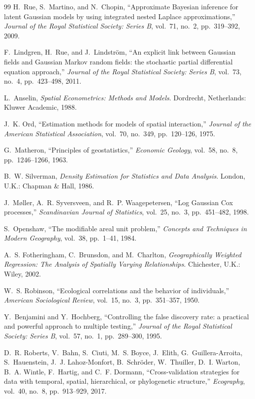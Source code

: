 \documentclass[conference]{IEEEtran}
\theoremstyle{definition}
\begin{document}
\begin{thebibliography}{99}
H.~Rue, S.~Martino, and N.~Chopin, ``Approximate Bayesian inference for latent Gaussian models by using integrated nested Laplace approximations,'' \emph{Journal of the Royal Statistical Society: Series B}, vol.~71, no.~2, pp.~319--392, 2009.

F.~Lindgren, H.~Rue, and J.~Lindstr\"{o}m, ``An explicit link between Gaussian fields and Gaussian Markov random fields: the stochastic partial differential equation approach,'' \emph{Journal of the Royal Statistical Society: Series B}, vol.~73, no.~4, pp.~423--498, 2011.

L.~Anselin, \emph{Spatial Econometrics: Methods and Models}. Dordrecht, Netherlands: Kluwer Academic, 1988.

J.~K. Ord, ``Estimation methods for models of spatial interaction,'' \emph{Journal of the American Statistical Association}, vol.~70, no.~349, pp.~120--126, 1975.

G.~Matheron, ``Principles of geostatistics,'' \emph{Economic Geology}, vol.~58, no.~8, pp.~1246--1266, 1963.

B.~W. Silverman, \emph{Density Estimation for Statistics and Data Analysis}. London, U.K.: Chapman \& Hall, 1986.

J.~M{\o}ller, A.~R. Syversveen, and R.~P. Waagepetersen, ``Log Gaussian Cox processes,'' \emph{Scandinavian Journal of Statistics}, vol.~25, no.~3, pp.~451--482, 1998.

S.~Openshaw, ``The modifiable areal unit problem,'' \emph{Concepts and Techniques in Modern Geography}, vol.~38, pp.~1--41, 1984.

A.~S. Fotheringham, C.~Brunsdon, and M.~Charlton, \emph{Geographically Weighted Regression: The Analysis of Spatially Varying Relationships}. Chichester, U.K.: Wiley, 2002.

W.~S. Robinson, ``Ecological correlations and the behavior of individuals,'' \emph{American Sociological Review}, vol.~15, no.~3, pp.~351--357, 1950.

Y.~Benjamini and Y.~Hochberg, ``Controlling the false discovery rate: a practical and powerful approach to multiple testing,'' \emph{Journal of the Royal Statistical Society: Series B}, vol.~57, no.~1, pp.~289--300, 1995.

D.~R. Roberts, V.~Bahn, S.~Ciuti, M.~S. Boyce, J.~Elith, G.~Guillera-Arroita, S.~Hauenstein, J.~J. Lahoz-Monfort, B.~Schr\"{o}der, W.~Thuiller, D.~I. Warton, B.~A. Wintle, F.~Hartig, and C.~F. Dormann, ``Cross-validation strategies for data with temporal, spatial, hierarchical, or phylogenetic structure,'' \emph{Ecography}, vol.~40, no.~8, pp.~913--929, 2017.


\end{thebibliography}
\end{document}
